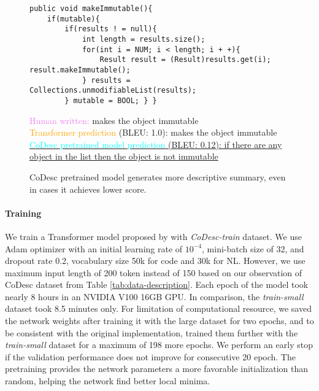 \documentclass[11pt,a4paper]{article}
\begin{document}
\begin{table}[t]
\centering
\setlength\arrayrulewidth{.6pt}
\caption{Code summarization with \citet{ncs} proposed Transformer network with and without pretraining with CoDesc.}
\label{tab:ncs-results}
\end{table}


\begin{figure*}
\begin{lstlisting}
public void makeImmutable(){ 
	if(mutable){ 
		if(results ! = null){ 
			int length = results.size(); 
			for(int i = NUM; i < length; i + +){ 
				Result result = (Result)results.get(i); result.makeImmutable(); 
			} results = Collections.unmodifiableList(results); 
		} mutable = BOOL; } }
\end{lstlisting}
\vspace{-4pt}
{\small
\renewcommand{\baselinestretch}{.4}
\textcolor{violet}{Human written:} makes the object immutable \\
\textcolor{orange}{Transformer prediction} (BLEU: 1.0): makes the object immutable \\
\uline{\textcolor{cyan}{CoDesc pretrained model prediction} (BLEU: 0.12): if there are any object in the list then the object is not immutable \hfill}
}
\caption{CoDesc pretrained model generates more descriptive summary, even in cases it achieves lower score.}
\label{fig:sample-data}
\end{figure*}



\paragraph{Training} 
We train a Transformer model proposed by \citet{ncs} with \textit{CoDesc-train} dataset. We use Adam optimizer with an initial learning rate of $10^{-4}$, mini-batch size of 32, and dropout rate 0.2, vocabulary size 50k for code and 30k for NL. However, we use maximum input length of 200 token instead of 150 based on our observation of CoDesc dataset from Table \ref{tab:data-description}. Each epoch of the model took nearly 8 hours in an NVIDIA V100 16GB GPU. In comparison, the \textit{train-small} dataset took 8.5 minutes only. For limitation of computational resource, we saved the network weights after training it with the large dataset for two epochs, and to be consistent with the original implementation, trained them further with the \textit{train-small} dataset for a maximum of 198 more epochs. We perform an early stop if the validation performance does not improve for consecutive 20 epoch. The pretraining provides the network parameters a more favorable initialization than random, helping the network find better local minima.
\end{document}
